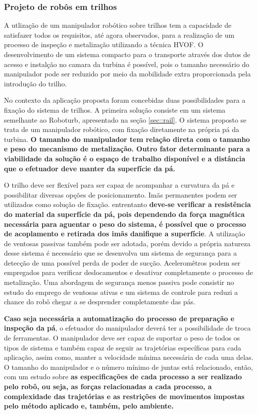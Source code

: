 \subsubsection{Projeto de robôs em trilhos}\label{proj_rail}
 
A utlização de um manipulador robótico sobre trilhos tem a
capacidade de satisfazer todos os requisitos, até agora observados, para a realização de um
processo de inspeção e metalização utilizando a técnica HVOF. O desenvolvimento
de um sistema compacto para o transporte através dos dutos de acesso e instalção
no camara da turbina é possível, pois o tamanho necessário do manipulador pode
ser reduzido por meio da mobilidade extra proporcionada pela introdução do
trilho.

No contexto da aplicação proposta foram concebidas duas possibilidades para a
fixação do sistema de trilhos. A primeira solução consiste em um sistema
semelhante ao Roboturb, apresentado na seção \ref{sec::rail}. O sistema proposto
se trata de um manipulador robótico, com fixação diretamente na própria pá da
turbina. \textbf{O tamanho do manipulador tem relação direta com o tamanho e
peso do mecanismo de metalização. Outro fator determinante para a viabilidade da
solução é o espaço de trabalho disponível e a distância que o efetuador deve
manter da superfície da pá.}

O trilho deve ser flexível para ser capaz de acompanhar a curvatura da pá e
possibilitar diversas opções de posicionamento. Imãs permanentes podem ser
utilizados como solução de fixação. entrentanto \textbf{deve-se verificar a
resistência do material da superfície da pá, pois dependendo da força magnética
necessária para aguentar o peso do sistema, é possível que o processo de
acoplamento e retirada dos imãs danifique a superfície}. A utilização de
ventosas passivas também pode ser adotada, porém devido a própria natureza desse
sistema é necessário que se desenvolva um sistema de segurança para a detecção
de uma possível perda de poder de sucção. Aceleromêtros podem ser empregados
para verificar deslocamentos e desativar completamente o processo de
metalização. Uma abordagem de segurança menos passiva pode consistir no estudo
do emprego de ventosas ativas e um sistema de controle para reduzi a chance do
robô chegar a se desprender completamente das pás.

\textbf{Caso seja necessária a automatização do processo de preparação e
inspeção da pá}, o efetuador do manipulador deverá ter a possibilidade de troca 
de ferramentas. O manipulador deve ser capaz de suportar o peso de todos os
tipos de sistema e também capaz de seguir as trajetórias específicas para cada
aplicação, assim como, manter a velocidade mínima necessária de cada uma delas.
O tamanho do manipulador e o número mínimo de juntas está relacionado, então,
com um estudo sobre \textbf{as especificações de cada processo a ser realizado
pelo robô, ou seja, as forças relacionadas a cada processo, a complexidade das
trajetórias e as restrições de movimentos impostas pelo método aplicado e,
também, pelo ambiente.}


